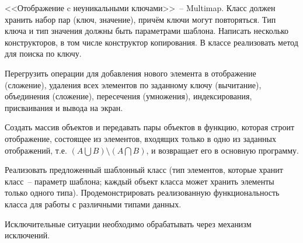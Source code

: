 <<Отображение c неуникальными ключами>>~-- Multimap. Класс должен хранить набор
пар (ключ, значение), причём ключи могут повторяться. Тип ключа и тип значения должны
быть параметрами шаблона. Написать несколько конструкторов, в том числе конструктор
копирования. В классе реализовать метод для поиска по ключу.

Перегрузить операции для
добавления нового элемента в отображение (сложение), удаления всех элементов по
заданному ключу (вычитание), объединения (сложение), пересечения (умножения),
индексирования, присваивания и вывода на экран.

Создать массив объектов и передавать
пары объектов в функцию, которая строит отображение, состоящее из элементов,
входящих только в одно из заданных отображений, т.е. $(A\bigcup B) \setminus (A\bigcap B)$, и возвращает его в
основную программу.

Реализовать предложенный шаблонный класс (тип элементов, которые
хранит класс~-- параметр шаблона; каждый объект класса может хранить
элементы только одного типа). Продемонстрировать реализованную
функциональность класса для работы с различными типами данных.



Исключительные ситуации необходимо обрабатывать через механизм исключений.
